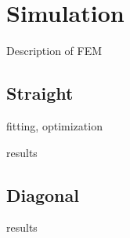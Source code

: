 \section{Simulation}
Description of FEM

\subsection{Straight}
fitting, optimization


results




\subsection{Diagonal}
results





